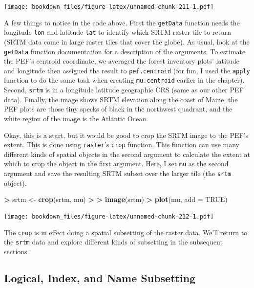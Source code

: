 \documentclass[]{krantz}
\makeatletter
\newenvironment{Shaded}{\begin{snugshade}}{\end{snugshade}}
\newcommand{\KeywordTok}[1]{\textcolor[rgb]{0.27,0.27,0.27}{\textbf{#1}}}
\newcommand{\DataTypeTok}[1]{\textcolor[rgb]{0.27,0.27,0.27}{#1}}
\newcommand{\StringTok}[1]{\textcolor[rgb]{0.5,0.5,0.5}{#1}}
\newcommand{\OtherTok}[1]{\textcolor[rgb]{0.37,0.37,0.37}{#1}}
\newcommand{\OperatorTok}[1]{\textcolor[rgb]{0.43,0.43,0.43}{\textbf{#1}}}
\newcommand{\ErrorTok}[1]{\textcolor[rgb]{0.14,0.14,0.14}{\textbf{#1}}}
\newcommand{\NormalTok}[1]{#1}
\newenvironment{kframe}{%
\medskip{}
\setlength{\fboxsep}{.8em}
 \def\at@end@of@kframe{}%
 \ifinner\ifhmode%
  \def\at@end@of@kframe{\end{minipage}}%
  \begin{minipage}{\columnwidth}%
 \fi\fi%
 \def\FrameCommand##1{\hskip\@totalleftmargin \hskip-\fboxsep
 \colorbox{shadecolor}{##1}\hskip-\fboxsep
     \hskip-\linewidth \hskip-\@totalleftmargin \hskip\columnwidth}%
 \MakeFramed {\advance\hsize-\width
   \@totalleftmargin\z@ \linewidth\hsize
   \@setminipage}}%
 {\par\unskip\endMakeFramed%
 \at@end@of@kframe}
\renewenvironment{Shaded}{\begin{kframe}}{\end{kframe}}
\makeatother
\begin{document}
\texttt{[image: bookdown\_files/figure-latex/unnamed-chunk-211-1.pdf]}

A few things to notice in the code above. First the \texttt{getData}
function needs the longitude \texttt{lon} and latitude \texttt{lat} to
identify which SRTM raster tile to return (SRTM data come in large
raster tiles that cover the globe). As usual, look at the
\texttt{getData} function documentation for a description of the
arguments. To estimate the PEF's centroid coordinate, we averaged the
forest inventory plots' latitude and longitude then assigned the result
to \texttt{pef.centroid} (for fun, I used the \texttt{apply} function to
do the same task when creating \texttt{mu.centroid} earlier in the
chapter). Second, \texttt{srtm} is in a longitude latitude geographic
CRS (same as our other PEF data). Finally, the image shows SRTM
elevation along the coast of Maine, the PEF plots are those tiny specks
of black in the northwest quadrant, and the white region of the image is
the Atlantic Ocean.

Okay, this is a start, but it would be good to crop the SRTM image to
the PEF's extent. This is done using \texttt{raster}'s \texttt{crop}
function. This function can use many different kinds of spatial objects
in the second argument to calculate the extent at which to crop the
object in the first argument. Here, I set \texttt{mu} as the second
argument and save the resulting SRTM subset over the larger tile (the
\texttt{srtm} object).

\begin{Shaded}
\begin{Highlighting}[]
\OperatorTok{>}\StringTok{ }\NormalTok{srtm <-}\StringTok{ }\KeywordTok{crop}\NormalTok{(srtm, mu)}
\OperatorTok{>}\StringTok{ }
\ErrorTok{>}\StringTok{ }\KeywordTok{image}\NormalTok{(srtm)}
\OperatorTok{>}\StringTok{ }\KeywordTok{plot}\NormalTok{(mu, }\DataTypeTok{add =} \OtherTok{TRUE}\NormalTok{)}
\end{Highlighting}
\end{Shaded}

\texttt{[image: bookdown\_files/figure-latex/unnamed-chunk-212-1.pdf]}

The \texttt{crop} is in effect doing a spatial subsetting of the raster
data. We'll return to the \texttt{srtm} data and explore different kinds
of subsetting in the subsequent sections.

\subsection{Logical, Index, and Name
Subsetting}\label{logical-index-and-name-subsetting}
\end{document}
